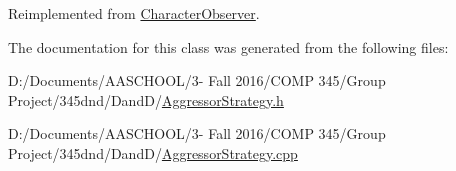 Reimplemented from \hyperlink{class_character_observer_a398d6d784065c7ed36c928d44a574630}{Character\+Observer}.



The documentation for this class was generated from the following files\+:\begin{DoxyCompactItemize}
\item 
D\+:/\+Documents/\+A\+A\+S\+C\+H\+O\+O\+L/3-\/ Fall 2016/\+C\+O\+M\+P 345/\+Group Project/345dnd/\+Dand\+D/\hyperlink{_aggressor_strategy_8h}{Aggressor\+Strategy.\+h}\item 
D\+:/\+Documents/\+A\+A\+S\+C\+H\+O\+O\+L/3-\/ Fall 2016/\+C\+O\+M\+P 345/\+Group Project/345dnd/\+Dand\+D/\hyperlink{_aggressor_strategy_8cpp}{Aggressor\+Strategy.\+cpp}\end{DoxyCompactItemize}
